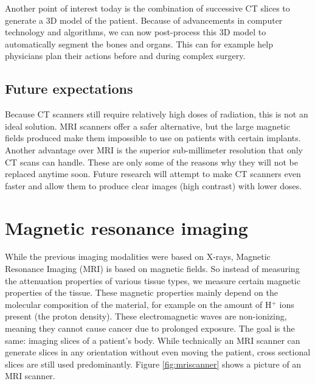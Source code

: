 Another point of interest today is the combination of successive CT slices to
generate a 3D model of the patient. Because of advancements in computer
technology and algorithms, we can now post-process this 3D model to
automatically segment the bones and organs. This can for example help physicians
plan their actions before and during complex surgery. %

\subsection{Future expectations}
Because CT scanners still require relatively high doses of radiation, this is
not an ideal solution. MRI scanners offer a safer alternative, but the large
magnetic fields produced make them impossible to use on patients with certain
implants. Another advantage over MRI is the superior sub-millimeter resolution
that only CT scans can handle. These are only some of the reasons why they will
not be replaced anytime soon. Future research will attempt to make CT scanners
even faster and allow them to produce clear images (high contrast) with lower
doses.

\section{Magnetic resonance imaging}
While the previous imaging modalities were based on X-rays, Magnetic Resonance
Imaging (MRI) is based on magnetic fields. So instead of measuring the
attenuation properties of various tissue types, we measure certain magnetic
properties of the tissue. These magnetic properties mainly depend on the
molecular composition of the material, for example on the amount of H$^+$
ions present (the proton density). These electromagnetic waves are non-ionizing,
meaning they cannot cause cancer due to prolonged exposure. The goal is the
same: imaging slices of a patient's body. While technically an MRI scanner can
generate slices in any orientation without even moving the patient, cross
sectional slices are still used predominantly. Figure \ref{fig:mriscanner}
shows a picture of an MRI scanner.

